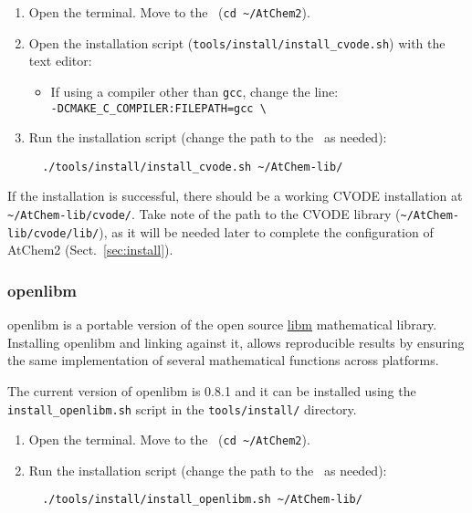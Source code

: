 \begin{enumerate}
\item Open the terminal. Move to the \maindir\ (\verb|cd ~/AtChem2|).
\item Open the installation script (\texttt{tools/install/install\_cvode.sh})
  with the text editor:
  \begin{itemize}
  \item If using a compiler other than \texttt{gcc}, change the line:\\
    \texttt{-DCMAKE\_C\_COMPILER:FILEPATH=gcc \textbackslash}
  \end{itemize}
\item Run the installation script (change the path to the \depdir\ as
  needed):
  \begin{verbatim}
  ./tools/install/install_cvode.sh ~/AtChem-lib/
  \end{verbatim}
\end{enumerate}

If the installation is successful, there should be a working CVODE
installation at \texttt{\textasciitilde/AtChem-lib/cvode/}. Take note
of the path to the CVODE library (\texttt{\textasciitilde/AtChem-lib/cvode/lib/}),
as it will be needed later to complete the configuration of AtChem2
(Sect.~\ref{sec:install}).

\subsubsection{openlibm}

openlibm is a portable version of the open source
\href{https://openlibm.org}{libm} mathematical library. Installing
openlibm and linking against it, allows reproducible results by
ensuring the same implementation of several mathematical functions
across platforms.

The current version of openlibm is 0.8.1 and it can be installed using
the \texttt{install\_openlibm.sh} script in the \texttt{tools/install/}
directory.

\begin{enumerate}
\item Open the terminal. Move to the \maindir\ (\verb|cd ~/AtChem2|).
\item Run the installation script (change the path to the \depdir\ as
  needed):
  \begin{verbatim}
  ./tools/install/install_openlibm.sh ~/AtChem-lib/
  \end{verbatim}
\end{enumerate}

